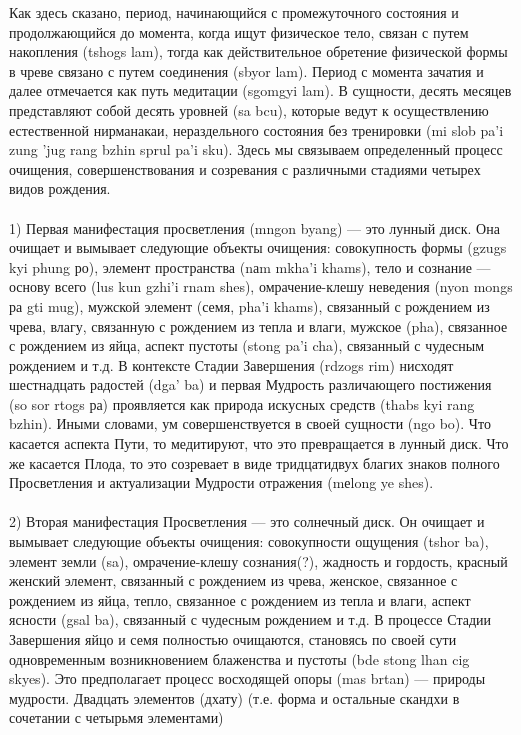 Как здесь сказано, период, начинающийся с промежуточного состояния и
продолжающийся до момента, когда ищут физическое тело, связан с путем накопления
(tshogs lam), тогда как действительное обретение физической формы в чреве связано с путем
соединения (sbyor lam). Период с момента зачатия и далее отмечается как путь медитации
(sgomgyi lam). В сущности, десять месяцев представляют собой десять уровней (sa bcu),
которые ведут к осуществлению естественной нирманакаи, нераздельного состояния без
тренировки (mi slob pa'i zung 'jug rang bzhin sprul pa'i sku).
Здесь мы связываем определенный процесс очищения, совершенствования и
созревания с различными стадиями четырех видов рождения.\\
\\
1) Первая манифестация просветления (mngon byang) — это лунный диск. Она
очищает и вымывает следующие объекты очищения: совокупность формы (gzugs kyi phung
ро), элемент пространства (nаm mkha'i khams), тело и сознание — основу всего (lus kun gzhi'i
rnam shes), омрачение-клешу неведения (nyon mongs ра gti mug), мужской элемент (семя,
pha'i khams), связанный с рождением из чрева, влагу, связанную с рождением из тепла и
влаги, мужское (pha), связанное с рождением из яйца, аспект пустоты (stong pa'i cha),
связанный с чудесным рождением и т.д. В контексте Стадии Завершения (rdzogs rim)
нисходят шестнадцать радостей (dga' ba) и первая Мудрость различающего постижения (so
sor rtogs ра) проявляется как природа искусных средств (thabs kyi rang bzhin). Иными
словами, ум совершенствуется в своей сущности (ngo bo). Что касается аспекта Пути, то
медитируют, что это превращается в лунный диск. Что же касается Плода, то это созревает в
виде тридцатидвух благих знаков полного Просветления и актуализации Мудрости
отражения (mеlong ye shes).\\
\\
2) Вторая манифестация Просветления — это солнечный диск. Он очищает и вымывает
следующие объекты очищения: совокупности ощущения (tshor ba), элемент земли (sa),
омрачение-клешу сознания(?), жадность и гордость, красный женский элемент, связанный с
рождением из чрева, женское, связанное с рождением из яйца, тепло, связанное с рождением
из тепла и влаги, аспект ясности (gsal ba), связанный с чудесным рождением и т.д. В
процессе Стадии Завершения яйцо и семя полностью очищаются, становясь по своей сути
одновременным возникновением блаженства и пустоты (bde stong lhan cig skyes). Это
предполагает процесс восходящей опоры (mas brtan) — природы мудрости. Двадцать
элементов (дхату) (т.е. форма и остальные скандхи в сочетании с четырьмя элементами)
